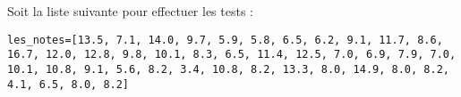 \def\xxnumchapitre{Chapitre 1 \vspace{.2cm}}
\def\xxchapitre{\hspace{.12cm} Découverte de l'algorithmique et de la programmation}

\def\xxcompetences{%
\textsl{%
\textbf{Savoirs et compétences :}\\
\vspace{-.4cm}
\begin{itemize}[label=\ding{112},font=\color{bleuxp}] 
\item .
\end{itemize}
}}


\def\xxfigures{
}%

\def\xxtitreexo{Structures algorithmiques}
\def\xxsourceexo{Lien Capytale \url{https://capytale2.ac-paris.fr/web/c/f807-628160/mcer}}
\def\xxactivite{TP 03 \ifprof  -- Corrigé \else \fi}


%

\setlength{\columnseprule}{.1pt}

\pagestyle{fancy}
\thispagestyle{plain}

\vspace{4.5cm}

\def\columnseprulecolor{\color{bleuxp}}
\setlength{\columnseprule}{0.4pt} 





\ifprof
\vspace{1.5cm}
\else
\fi



Soit la liste suivante pour effectuer les tests : 
\begin{lstlisting}
les_notes=[13.5, 7.1, 14.0, 9.7, 5.9, 5.8, 6.5, 6.2, 9.1, 11.7, 8.6, 16.7, 12.0, 12.8, 9.8, 10.1, 8.3, 6.5, 11.4, 12.5, 7.0, 6.9, 7.9, 7.0, 10.1, 10.8, 9.1, 5.6, 8.2, 3.4, 10.8, 8.2, 13.3, 8.0, 14.9, 8.0, 8.2, 4.1, 6.5, 8.0, 8.2]
\end{lstlisting}

